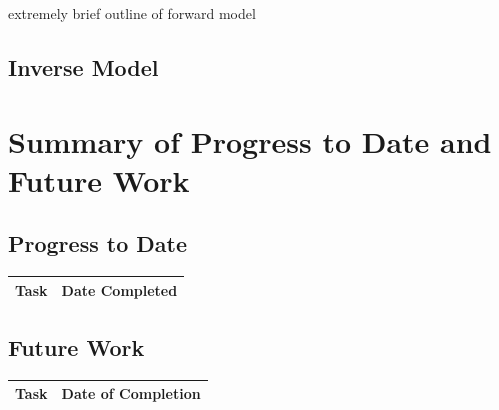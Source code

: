 \documentclass[titlepage,12pt,letterpaper]{article}
\begin{document}
extremely brief outline of forward model


\subsection{Inverse Model}\label{DA_project:inverse_model}


\newpage

\clearpage
\section{Summary of Progress to Date and Future Work}
\subsection{Progress to Date}

\begin{tabular}{|l|c|} \hline
\multicolumn{1}{|c|}{\bf{Task}} & \multicolumn{1}{|c|}{\bf{Date
    Completed}} \\




\hline
\end{tabular}

\subsection{Future Work}

\begin{tabular}{|l|c|} \hline
\multicolumn{1}{|c|}{\bf{Task}} & \multicolumn{1}{|c|}{\bf{
    Date of Completion}} \\

\hline
\end{tabular}

\newpage
 

\end{document}
